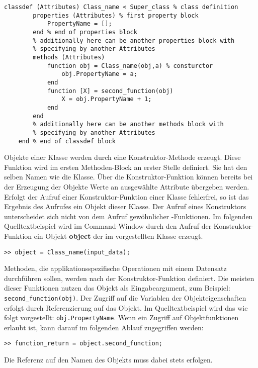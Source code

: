 \begin{lstlisting}[float=h!,caption={Beispiel Klassendefinition},label={Klassendefinition}, frame=none]
	classdef (Attributes) Class_name < Super_class % class definition
		properties (Attributes) % first property block
			PropertyName = [];
		end % end of properties block
		% additionally here can be another properties block with 
		% specifying by another Attributes
		methods (Attributes) 
			function obj = Class_name(obj,a) % consturctor
				obj.PropertyName = a;
			end
			function [X] = second_function(obj)
				X = obj.PropertyName + 1;
			end
		end
		% additionally here can be another methods block with 
		% specifying by another Attributes
	end % end of classdef block
\end{lstlisting}

Objekte einer Klasse werden durch eine Konstruktor-Methode erzeugt. Diese
Funktion wird im ersten Methoden-Block an erster Stelle definiert. Sie hat den
selben Namen wie die Klasse. \"Uber die Konstruktor-Funktion k\"onnen bereits
bei der Erzeugung der Objekte Werte an ausgew\"ahlte Attribute \"ubergeben
werden. Erfolgt der Aufruf einer Konstruktor-Funktion einer Klasse fehlerfrei,
so ist das Ergebnis des Aufrufes ein Objekt dieser Klasse. Der Aufruf eines
Konstruktors unterscheidet sich nicht von dem Aufruf gew\"ohnlicher
\matlab-Funktionen. Im folgenden Quelltextbeispiel wird im Command-Window durch
den Aufruf der Konstruktor-Funktion ein Objekt \textbf{object} der im
 vorgestellten Klasse erzeugt.
\begin{lstlisting}[frame=none]
	>> object = Class_name(input_data);
\end{lstlisting}

Methoden, die applikationsspezifische Operationen mit einem Datensatz
durchf\"uhren sollen, werden nach der Konstruktor-Funktion definiert.  Die
meisten dieser Funktionen nutzen das Objekt als Eingabeargument, zum Beispiel:
\lstinline{second_function(obj)}. Der Zugriff auf die Variablen der
Objekteigenschaften erfolgt durch Referenzierung auf das Objekt. Im
Quelltextbeispiel  wird das wie folgt vorgestellt:
\lstinline{obj.PropertyName}. Wenn ein Zugriff auf Objektfunktionen erlaubt ist,
kann darauf im folgenden Ablauf zugegriffen werden:

\begin{lstlisting}[frame=none]
	>> function_return = object.second_function;
\end{lstlisting}
\noindent Die Referenz auf den Namen des Objekts muss dabei stets erfolgen.

